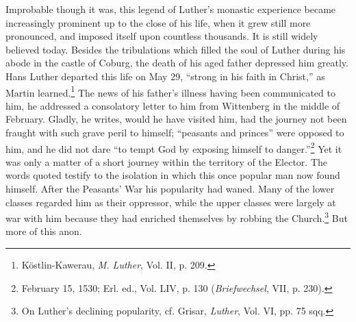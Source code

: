 Improbable though it was, this legend of Luther’s monastic experience
became increasingly prominent up to the close of his life,
when it grew still more pronounced, and imposed itself upon countless
thousands. It is still widely believed today.
Besides the tribulations which filled the soul of Luther during his
abode in the castle of Coburg, the death of his aged father depressed
him greatly. Hans Luther departed this life on May 29, “strong in
his faith in Christ,” as Martin learned.\footnote{Köstlin-Kawerau, \textit{M. Luther}, Vol. II, p. 209.}
 The news of his father’s
illness having been communicated to him, he addressed a consolatory
letter to him from Wittenberg in the middle of February. Gladly, he
writes, would he have visited him, had the journey not been fraught
with such grave peril to himself; “peasants and princes” were opposed
to him, and he did not dare “to tempt God by exposing himself to
danger.”\footnote{February 15, 1530; Erl. ed., Vol. LIV, p. 130 (\textit{Briefwechsel}, VII, p. 230).}
 Yet it was only a matter of a short journey within the
territory of the Elector. The words quoted testify to the isolation in
which this once popular man now found himself. After the Peasants’
War his popularity had waned. Many of the lower classes regarded
him as their oppressor, while the upper classes were largely at war
with him because they had enriched themselves by robbing the
Church.\footnote{On Luther’s declining popularity, cf. Grisar, \textit{Luther}, Vol. VI, pp. 75 sqq.}
But more of this anon.
